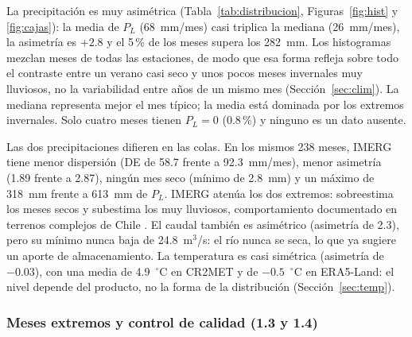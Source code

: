 \documentclass[11pt,a4paper]{article}
\newcommand{\PL}{P_L}
\begin{document}
La precipitación es muy asimétrica (Tabla~\ref{tab:distribucion}, Figuras~\ref{fig:hist} y \ref{fig:cajas}): la media de $\PL$ (68~mm/mes) casi triplica la mediana (26~mm/mes), la asimetría es $+2.8$ y el 5\,\% de los meses supera los 282~mm. Los histogramas mezclan meses de todas las estaciones, de modo que esa forma refleja sobre todo el contraste entre un verano casi seco y unos pocos meses invernales muy lluviosos, no la variabilidad entre años de un mismo mes (Sección~\ref{sec:clim}). La mediana representa mejor el mes típico; la media está dominada por los extremos invernales. Solo cuatro meses tienen $\PL=0$ (0.8\,\%) y ninguno es un dato ausente.

Las dos precipitaciones difieren en las colas. En los mismos 238 meses, IMERG tiene menor dispersión (DE de 58.7 frente a 92.3~mm/mes), menor asimetría (1.89 frente a 2.87), ningún mes seco (mínimo de 2.8~mm) y un máximo de 318~mm frente a 613~mm de $\PL$. IMERG atenúa los dos extremos: sobreestima los meses secos y subestima los muy lluviosos, comportamiento documentado en terrenos complejos de Chile \citep{Zambrano2017,SotoAlvarez2020,Rojas2021}. El caudal también es asimétrico (asimetría de 2.3), pero su mínimo nunca baja de 24.8~m$^3$/s: el río nunca se seca, lo que ya sugiere un aporte de almacenamiento. La temperatura es casi simétrica (asimetría de $-0.03$), con una media de 4.9~$^\circ$C en CR2MET y de $-0.5$~$^\circ$C en ERA5-Land: el nivel depende del producto, no la forma de la distribución (Sección~\ref{sec:temp}).

\subsubsection{Meses extremos y control de calidad (1.3 y 1.4)}
\end{document}
